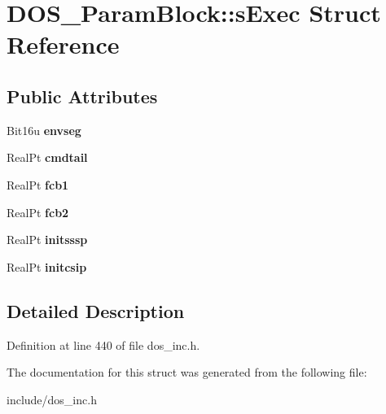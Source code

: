 \hypertarget{structDOS__ParamBlock_1_1sExec}{\section{D\-O\-S\-\_\-\-Param\-Block\-:\-:s\-Exec Struct Reference}
\label{structDOS__ParamBlock_1_1sExec}
}
\subsection*{Public Attributes}
\begin{DoxyCompactItemize}
\item 
\hypertarget{structDOS__ParamBlock_1_1sExec_ab687ac3ee3f86582a88216f428b86770}{Bit16u {\bfseries envseg}}\label{structDOS__ParamBlock_1_1sExec_ab687ac3ee3f86582a88216f428b86770}

\item 
\hypertarget{structDOS__ParamBlock_1_1sExec_ab6b6951382774b8c938f9428192c529d}{Real\-Pt {\bfseries cmdtail}}\label{structDOS__ParamBlock_1_1sExec_ab6b6951382774b8c938f9428192c529d}

\item 
\hypertarget{structDOS__ParamBlock_1_1sExec_a90a2f5095e246afb9c22e59625d47637}{Real\-Pt {\bfseries fcb1}}\label{structDOS__ParamBlock_1_1sExec_a90a2f5095e246afb9c22e59625d47637}

\item 
\hypertarget{structDOS__ParamBlock_1_1sExec_a07ee173102f3e88504b4c76674174243}{Real\-Pt {\bfseries fcb2}}\label{structDOS__ParamBlock_1_1sExec_a07ee173102f3e88504b4c76674174243}

\item 
\hypertarget{structDOS__ParamBlock_1_1sExec_a0541b0ed955144e206155d01815ab077}{Real\-Pt {\bfseries initsssp}}\label{structDOS__ParamBlock_1_1sExec_a0541b0ed955144e206155d01815ab077}

\item 
\hypertarget{structDOS__ParamBlock_1_1sExec_a9fd385a207f3887bc6e26973d2b11e8f}{Real\-Pt {\bfseries initcsip}}\label{structDOS__ParamBlock_1_1sExec_a9fd385a207f3887bc6e26973d2b11e8f}

\end{DoxyCompactItemize}


\subsection{Detailed Description}


Definition at line 440 of file dos\-\_\-inc.\-h.



The documentation for this struct was generated from the following file\-:\begin{DoxyCompactItemize}
\item 
include/dos\-\_\-inc.\-h\end{DoxyCompactItemize}
